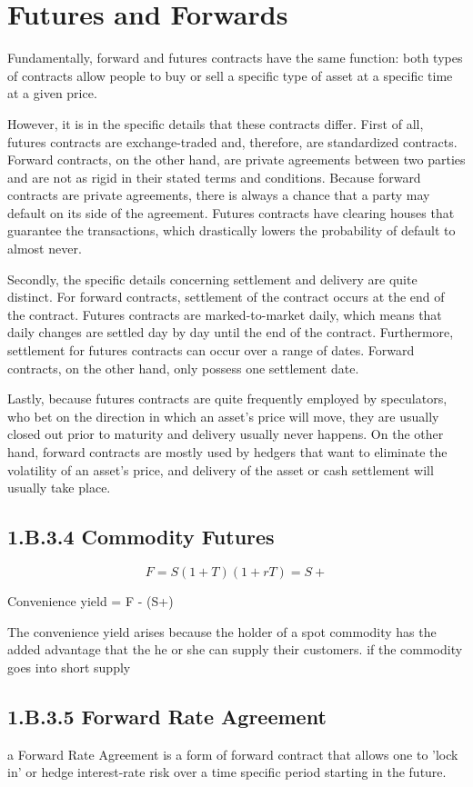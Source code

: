 \section{Futures and Forwards}

Fundamentally, forward and futures contracts have the same function: both types of contracts allow people to buy or sell a specific type of asset at a specific time at a given price. 

However, it is in the specific details that these contracts differ. First of all, futures contracts are exchange-traded and, therefore, are standardized contracts. Forward contracts, on the other hand, are private agreements between two parties and are not as rigid in their stated terms and conditions. Because forward contracts are private agreements, there is always a chance that a party may default on its side of the agreement. Futures contracts have clearing houses that guarantee the transactions, which drastically lowers the probability of default to almost never. 

Secondly, the specific details concerning settlement and delivery are quite distinct. For forward contracts, settlement of the contract occurs at the end of the contract. Futures contracts are marked-to-market daily, which means that daily changes are settled day by day until the end of the contract. Furthermore, settlement for futures contracts can occur over a range of dates. Forward contracts, on the other hand, only possess one settlement date.  

Lastly, because futures contracts are quite frequently employed by speculators, who bet on the direction in which an asset's price will move, they are usually closed out prior to maturity and delivery usually never happens. On the other hand, forward contracts are mostly used by hedgers that want to eliminate the volatility of an asset's price, and delivery of the asset or cash settlement will usually take place.  

\subsection{1.B.3.4 Commodity Futures}

\[F=S(1+T)(1+rT) = S +\]

Convenience yield = F - (S+)

The convenience yield arises because the holder of a spot commodity has the added advantage
that the he or she can supply their customers. if the commodity goes into short supply

\subsection{1.B.3.5 Forward Rate Agreement}
a Forward Rate Agreement is a form of forward contract that allows one to 'lock in'
or hedge interest-rate risk over a time specific period starting in the future.


